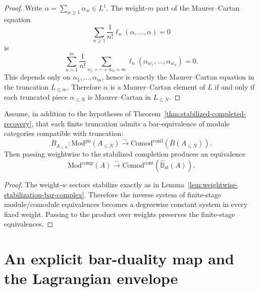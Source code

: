 \begin{proof}
Write $\alpha=\sum_{w\ge 1}\alpha_w\in L^1$. The weight-$m$ part of the
Maurer--Cartan equation
\[
\sum_{n\ge 1}\frac{1}{n!}\ell_n(\alpha,\dots,\alpha)=0
\]
is
\[
\sum_{n=1}^{m}\frac{1}{n!}
\sum_{w_1+\cdots+w_n=m}
\ell_n(\alpha_{w_1},\dots,\alpha_{w_n})=0.
\]
This depends only on $\alpha_1,\dots,\alpha_m$, hence is exactly the
Maurer--Cartan equation in the truncation $L_{\le m}$. Therefore $\alpha$ is a
Maurer--Cartan element of $L$ if and only if each truncated piece
$\alpha_{\le N}$ is Maurer--Cartan in $L_{\le N}$.
\end{proof}

\begin{proposition}
\label{prop:module-comodule-stabilized}
Assume, in addition to the hypotheses of
Theorem~\ref{thm:stabilized-completed-recovery}, that each finite truncation
admits a bar-equivalence of module categories compatible with truncation:
\[
\overline{B}_{A_{\le N}}\colon \mathrm{Mod}^{\mathrm{pn}}(A_{\le N})
\xrightarrow{\sim}
\mathrm{Comod}^{\mathrm{conil}}(\overline{B}(A_{\le N})).
\]
Then passing weightwise to the stabilized completion produces an equivalence
\[
\mathrm{Mod}^{\mathrm{comp}}(A)
\xrightarrow{\sim}
\mathrm{Comod}^{\mathrm{cont}}(\widehat{\mathbb{B}}_{\mathrm{st}}(A)).
\]
\end{proposition}

\begin{proof}
The weight-$w$ sectors stabilize exactly as in
Lemma~\ref{lem:weightwise-stabilization-bar-complex}. Therefore the inverse
system of finite-stage module/comodule equivalences becomes a degreewise
constant system in every fixed weight. Passing to the product over weights
preserves the finite-stage equivalences.
\end{proof}

\section{An explicit bar-duality map and the Lagrangian envelope}
\label{sec:explicit-bar-duality-lagrangian-envelope}

